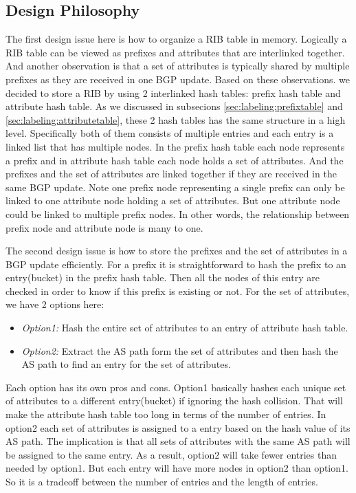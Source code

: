\subsection{Design Philosophy}
The first design issue here is how to organize a RIB table in memory. Logically a RIB table can be viewed as prefixes and attributes that are interlinked together. And another observation is that a set of attributes is typically shared by multiple prefixes as they are received in one BGP update.  Based on these observations. we decided to store a RIB by using 2 interlinked hash tables: prefix hash table and attribute hash table.
As we discussed in subsecions \ref{sec:labeling:prefixtable} and \ref{sec:labeling:attributetable}, these 2 hash tables has the same structure in a high level. Specifically both of them consists of multiple entries and each entry is a linked list that has multiple nodes. In the prefix hash table each node represents a prefix and in attribute hash table each node holds a set of attributes. And the prefixes and the set of attributes are linked together if they are received in the same BGP update. Note one prefix node representing a single prefix can only be linked to one attribute node holding a set of attributes. But one attribute node could be linked to multiple prefix nodes. In other words, the relationship between prefix node and attribute node is many to one.

The second design issue is how to store the prefixes and the set of attributes in a BGP update efficiently. For a prefix it is straightforward to hash the prefix to an entry(bucket) in the prefix hash table. Then all the nodes of this entry are checked in order to know if this prefix is existing or not. For the set of attributes, we have 2 options here:
	\begin{itemize}
		\item{\emph{Option1: }Hash the entire set of attributes to an entry of attribute hash table.}		
		\item{\emph{Option2: }Extract the AS path form the set of attributes and then hash the AS path to find an entry for the set of attributes.}
	\end{itemize}
Each option has its own pros and cons. Option1 basically hashes each unique set of attributes to a different entry(bucket) if ignoring the hash collision. That will make the attribute hash table too long in terms of the number of entries.
In option2 each set of attributes is assigned to a entry based on the hash value of its AS path. The implication is that all sets of attributes with the same AS path will be assigned to the same entry. As a result, option2 will take fewer entries than needed by option1. But each entry will have more nodes in option2 than option1. So it is a tradeoff between the number of entries and the length of entries.

